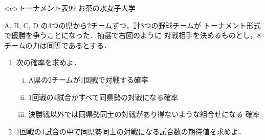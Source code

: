 \begin{itemtbsquarebox}<c>{トーナメント表}{99 お茶の水女子大学}
\begin{mawarikomi}{}{\tate}%
A, B, C, D の4つの県から2チームずつ，計8つの野球チームが
トーナメント形式で優勝を争うことになった．抽選で右図のように
対戦相手を決めるものとし，8チームの力は同等であるとする．
\end{mawarikomi}
\begin{enumerate}[(1)]
  \item 次の確率を求めよ．
  \begin{enumerate}[(i)]
    \item A県の2チームが1回戦で対戦する確率
    \item 1回戦の4試合がすべて同県勢の対戦になる確率
    \item 決勝戦以外では同県勢同士の対戦があり得ないような組合せになる
      確率
  \end{enumerate}
  \item 1回戦の4試合の中で同県勢同士の対戦になる試合数の期待値を求めよ．
\end{enumerate}
\end{itemtbsquarebox}\par
